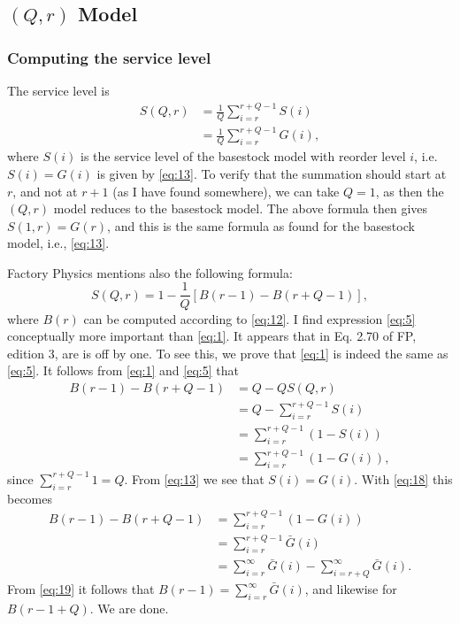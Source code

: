 
\subsection{$(Q,r)$ Model}

\subsubsection{Computing the service level}

The service level is
\begin{equation}
  \label{eq:5}
  \begin{split}
   S(Q,r) 
   &= \frac1Q \sum_{i=r}^{r+Q-1} S(i) \\
   &= \frac1Q \sum_{i=r}^{r+Q-1} G(i),
  \end{split}
\end{equation}
where $S(i)$ is the service level of the basestock model with reorder
level $i$, i.e. $S(i)=G(i)$ is given by \ref{eq:13}.  To verify that
the summation should start at $r$, and not at $r+1$ (as I have found
somewhere), we can take $Q=1$, as then the $(Q,r)$ model reduces to
the basestock model. The above formula then gives $S(1,r)= G(r)$, and
this is the same formula as found for the basestock model, i.e.,
\ref{eq:13}.


Factory Physics mentions also the following formula:
\begin{equation}
  \label{eq:1}
   S(Q,r) = 1- \frac1Q [B(r-1) - B(r+Q-1)],
\end{equation}
where $B(r)$ can be computed according to \ref{eq:12}.  I find
expression \ref{eq:5} conceptually more important than \ref{eq:1}. It
appears that in Eq. 2.70 of FP, edition 3, are is off by one. To see
this, we prove that \ref{eq:1} is indeed the same as \ref{eq:5}. It
follows from \ref{eq:1} and \ref{eq:5} that
\begin{equation*}
  \begin{split}
   B(r-1) - B(r+Q-1) 
   &= Q - Q S(Q,r) \\
   &= Q - \sum_{i=r}^{r+Q-1} S(i) \\
   &= \sum_{i=r}^{r+Q-1}(1- S(i)) \\
   &= \sum_{i=r}^{r+Q-1}(1- G(i)),
  \end{split}
\end{equation*}
since $\sum_{i=r}^{r+Q-1} 1 = Q$. From \ref{eq:13} we see that $S(i)
= G(i)$. With \ref{eq:18} this becomes
\begin{equation*}
  \begin{split}
    B(r-1) - B(r+Q-1)
    &= \sum_{i=r}^{r+Q-1}(1- G(i))\\
    &= \sum_{i=r}^{r+Q-1} \bar G(i)\\
    &= \sum_{i=r}^{\infty} \bar G(i) -\sum_{i=r+Q}^\infty \bar G(i).
  \end{split}
\end{equation*}
From \ref{eq:19} it follows that $B(r-1)=\sum_{i=r}^{\infty} \bar
G(i)$, and likewise for $B(r-1+Q)$. We are done.


